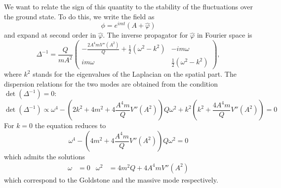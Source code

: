 \documentclass[11pt]{article}
\numberwithin{equation}{section}
\begin{document}
We want to relate the sign of this quantity to the stability of the fluctuations over the ground state.
To do this, we write the field as
\begin{equation}
  \phi = e^{i m t} (A + \hat \varphi)  
\end{equation}
and expand at second order in \(\hat \varphi\).
The inverse propagator for \(\hat \varphi \) in Fourier space is
\begin{equation}
  \Delta^{-1} = \frac{Q}{m A^2}
  \begin{pmatrix}
    -\frac{2 A^4 m V''(A^2)}{Q}  + \frac{1}{2}  (\omega^2 - k^2) & -  i m  \omega \\
     i m  \omega &  \frac{1}{2}  (\omega^2 - k^2)
  \end{pmatrix},
\end{equation}
where \(k^2\) stands for the eigenvalues of the Laplacian on the spatial part.
The dispersion relations for the two modes are obtained from the condition \(\det(\Delta^{-1}) = 0\):
\begin{equation}
  \det(\Delta^{-1}) \propto \omega^4 - \left(  2 k^2 + 4 m^2 + 4 \frac{A^4 m}{Q} V''(A^2)  \right) Q \omega^2 + k^2 \left(  k^2 + \frac{4 A^4 m}{Q} V''(A^2)  \right)  = 0
\end{equation}
For \(k = 0\) the equation reduces to
\begin{equation}
  \omega^4 - \left( 4 m^2 + 4 \frac{A^4 m}{Q} V''(A^2)  \right)   Q \omega^2  = 0
\end{equation}
which admits the solutions
\begin{align}
  \omega &= 0  & \omega^2 &=  4 m^2 Q + 4 A^4 m V''(A^2)
\end{align}
which correspond to the Goldstone and the massive mode respectively.
\end{document}
